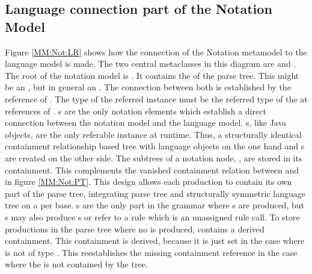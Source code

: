 \subsection{Language connection part of the Notation Model} \label{sec:MM:Not:Prod}
Figure \ref{MM:Not:LR} shows how the connection of the Notation metamodel to the language model is made. The two central metaclasses in this diagram are  and . The root of the notation model is . It contains the  of the parse tree. This might be an , but in general an . The connection between both is established by the reference  of .  The type of the referred instance must be the referred type of the  at  references of . s are the only notation elements which establish a direct connection between the notation model and the language model. s, like Java objects, are the only referable instance at runtime. Thus, a structurally identical containment relationship based tree with language objects on the one hand and s are created on the other side. The subtrees of a notation node, , are stored in its  containment. This complements the vanished containment relation between  and  in figure \ref{MM:Not:PT}. This design allows each  production to contain its own part of the parse tree, integrating parse tree and structurally symmetric language tree on a per  base. s are the only part in the grammar where s are produced, but s may also produce s or refer to a rule which is an unassigned rule call. To store productions in the parse tree where no  is produced,  contains a derived  containment. This containment is derived, because it is just set in the case where  is not of type . This reestablishes the missing containment reference in the case where the  is not contained by the  tree. \\
